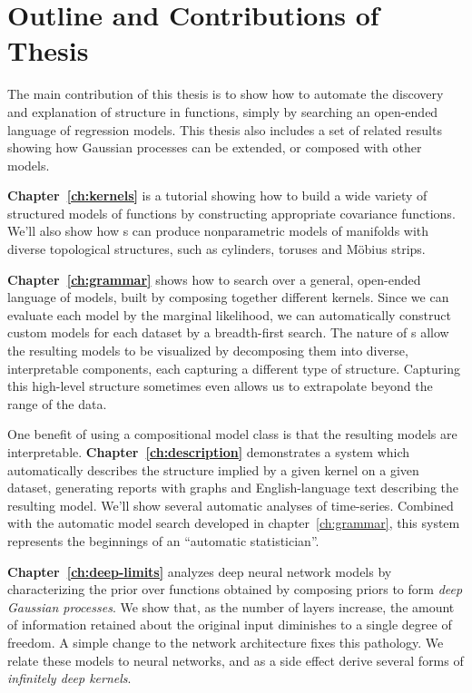 \section{Outline and Contributions of Thesis}

The main contribution of this thesis is to show how to automate the discovery and explanation of structure in functions, simply by searching an open-ended language of regression models.
This thesis also includes a set of related results showing how Gaussian processes can be extended, or composed with other models.

{\bf Chapter~\ref{ch:kernels}} is a tutorial showing how to build a wide variety of structured models of functions by constructing appropriate covariance functions.
We'll also show how \gp{}s can produce nonparametric models of manifolds with diverse topological structures, such as cylinders, toruses and M\"obius strips.

{\bf Chapter~\ref{ch:grammar}} shows how to search over a general, open-ended language of models, built by composing together different kernels.
Since we can evaluate each model by the marginal likelihood, we can automatically construct custom models for each dataset by a breadth-first search.
The nature of \gp{}s allow the resulting models to be visualized by decomposing them into diverse, interpretable components, each capturing a different type of structure.
Capturing this high-level structure sometimes even allows us to extrapolate beyond the range of the data.

One benefit of using a compositional model class is that the resulting models are interpretable.
{\bf Chapter~\ref{ch:description}} demonstrates a system which automatically describes the structure implied by a given kernel on a given dataset, generating reports with graphs and English-language text describing the resulting model.
We'll show several automatic analyses of time-series.
Combined with the automatic model search developed in chapter~\ref{ch:grammar}, this system represents the beginnings of an ``automatic statistician''.


{\bf Chapter~\ref{ch:deep-limits}} analyzes deep neural network models by characterizing the prior over functions obtained by composing \gp{} priors to form \emph{deep Gaussian processes}.
We show that, as the number of layers increase, the amount of information retained about the original input diminishes to a single degree of freedom.
A simple change to the network architecture fixes this pathology.
We relate these models to neural networks, and as a side effect derive several forms of \emph{infinitely deep kernels}.


